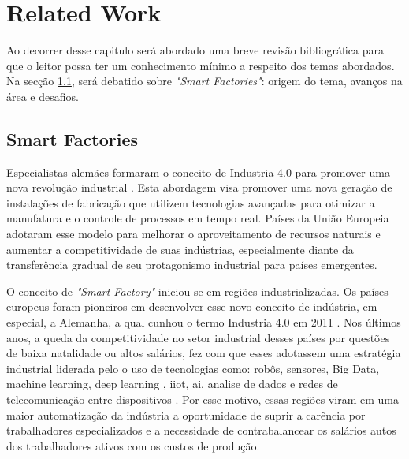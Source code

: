 \chapter{Related Work}\label{cap:relatedWork}

Ao decorrer desse capitulo será abordado uma breve revisão bibliográfica para que o leitor possa ter um conhecimento mínimo a respeito dos temas abordados. Na secção \ref{sec:smartFactories}, será debatido sobre \emph{"Smart Factories"}: origem do tema, avanços na área e desafios. 


\section{Smart Factories}
\label{sec:smartFactories}

Especialistas alemães formaram o conceito de Industria 4.0 para promover uma nova revolução industrial \cite{Grabowska+2020+90+96}. Esta abordagem visa promover uma nova geração de instalações de fabricação que utilizem tecnologias avançadas para otimizar a manufatura e o controle de processos em tempo real. Países da União Europeia adotaram esse modelo para melhorar o aproveitamento de recursos naturais e aumentar a competitividade de suas indústrias, especialmente diante da transferência gradual de seu protagonismo industrial para países emergentes.

O conceito de  \emph{"Smart Factory"} iniciou-se em regiões industrializadas. Os países europeus foram  pioneiros em desenvolver esse novo conceito de indústria, em especial, a Alemanha, a qual cunhou o termo Industria 4.0 em 2011 \cite{Grabowska+2020+90+96}. Nos últimos anos, a queda da competitividade no setor industrial desses países por questões de baixa natalidade ou altos salários, fez com que esses adotassem uma estratégia industrial liderada pelo o uso de tecnologias como: robôs, sensores, Big Data, machine learning, deep learning , \acrfull{iiot}, \acrfull{ai}, analise de dados e redes de telecomunicação entre dispositivos \cite{HerreroMeasuringTheEffectivenessOfIndustrialProcesses}. Por esse motivo, essas regiões viram em uma maior automatização da indústria a oportunidade de suprir a carência por trabalhadores especializados e a necessidade de contrabalancear os  salários autos dos trabalhadores ativos com os custos de produção.  


